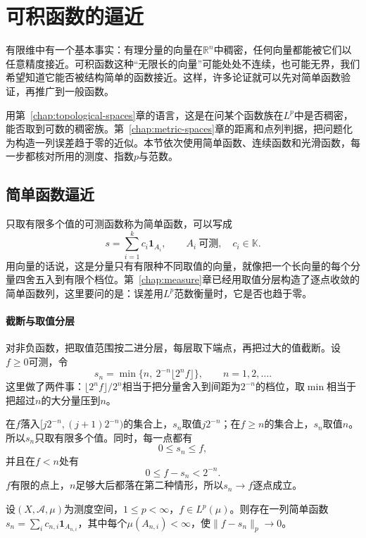 \section{可积函数的逼近}
\label{sec:fapprox-integrable}

有限维中有一个基本事实：有理分量的向量在$\mathbb R^n$中稠密，任何向量都能被它们以任意精度接近。可积函数这种“无限长的向量”可能处处不连续，也可能无界，我们希望知道它能否被结构简单的函数接近。这样，许多论证就可以先对简单函数验证，再推广到一般函数。

用第~\ref{chap:topological-spaces}章的语言，这是在问某个函数族在$L^p$中是否稠密，能否取到可数的稠密族。第~\ref{chap:metric-spaces}章的距离和点列判据，把问题化为构造一列误差趋于零的近似。本节依次使用简单函数、连续函数和光滑函数，每一步都核对所用的测度、指数$p$与范数。

\subsection{简单函数逼近}
\label{sec:fapprox-simple}

只取有限多个值的可测函数称为简单函数，可以写成
\[
 s=\sum_{i=1}^kc_i\mathbf 1_{A_i},\qquad A_i\ \text{可测},\quad c_i\in\mathbb K .
\]
用向量的话说，这是分量只有有限种不同取值的向量，就像把一个长向量的每个分量四舍五入到有限个档位。第~\ref{chap:measure}章已经用取值分层构造了逐点收敛的简单函数列，这里要问的是：误差用$L^p$范数衡量时，它是否也趋于零。

\paragraph{截断与取值分层}
对非负函数，把取值范围按二进分层，每层取下端点，再把过大的值截断。设$f\geq0$可测，令
\begin{equation}
 s_n=\min\bigl\{n,\ 2^{-n}\lfloor2^nf\rfloor\bigr\},\qquad n=1,2,\ldots .
 \label{eq:fapprox-dyadic-simple}
\end{equation}
这里做了两件事：$\lfloor2^nf\rfloor/2^n$相当于把分量舍入到间距为$2^{-n}$的档位，取$\min$相当于把超过$n$的大分量压到$n$。

在$f$落入$[j2^{-n},(j+1)2^{-n})$的集合上，$s_n$取值$j2^{-n}$；在$f\geq n$的集合上，$s_n$取值$n$。所以$s_n$只取有限多个值。同时，每一点都有
\[
 0\leq s_n\leq f,
\]
并且在$f<n$处有
\[
 0\leq f-s_n<2^{-n}.
\]
$f$有限的点上，$n$足够大后都落在第二种情形，所以$s_n\to f$逐点成立。

\begin{theorem}[简单函数逼近$L^p$函数]
\label{thm:fapprox-simple-dense}
设$(X,\mathcal A,\mu)$为测度空间，$1\leq p<\infty$，$f\in L^p(\mu)$。则存在一列简单函数$s_n=\sum_ic_{n,i}\mathbf 1_{A_{n,i}}$，其中每个$\mu(A_{n,i})<\infty$，使$\lVert f-s_n\rVert_p\to0$。
\end{theorem}

